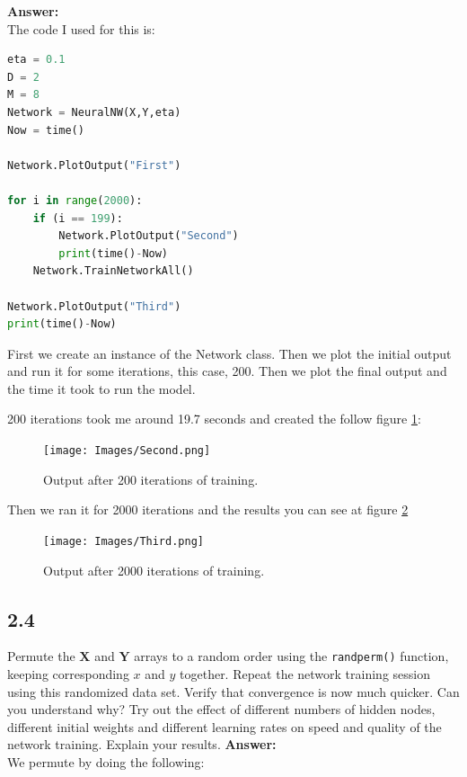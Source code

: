 \documentclass[a4paper]{article}
\begin{document}
\textbf{Answer:}\\


The code I used for this is:


\begin{lstlisting}[language=Python]
eta = 0.1
D = 2
M = 8
Network = NeuralNW(X,Y,eta)
Now = time()

Network.PlotOutput("First")

for i in range(2000):
    if (i == 199):
        Network.PlotOutput("Second")
        print(time()-Now)
    Network.TrainNetworkAll()

Network.PlotOutput("Third")
print(time()-Now)
\end{lstlisting}

First we create an instance of the Network class. Then we plot the initial output and run it for some iterations, this case, 200. Then we plot the final output and the time it took to run the model.

200 iterations took me around 19.7 seconds and created the follow figure \ref{Second}:

\begin{figure}[H]
\texttt{[image: Images/Second.png]}
\caption{Output after 200 iterations of training.}
\label{Second}
\end{figure}


Then we ran it for 2000 iterations and the results you can see at figure \ref{Third}

\begin{figure}[H]
\texttt{[image: Images/Third.png]}
\caption{Output after 2000 iterations of training.}
\label{Third}
\end{figure}

\subsection*{2.4}

Permute the $\textbf{X}$ and $\textbf{Y}$ arrays to a random order using the \texttt{randperm()} function, keeping corresponding $x$ and $y$ together. Repeat the network training session using this randomized data set. Verify that convergence is now much quicker. Can you understand why? Try out the effect of different numbers of hidden nodes, different initial weights and different learning rates on speed and quality of the network training. Explain your results.
\textbf{Answer:}\\


We permute by doing the following:
\end{document}
